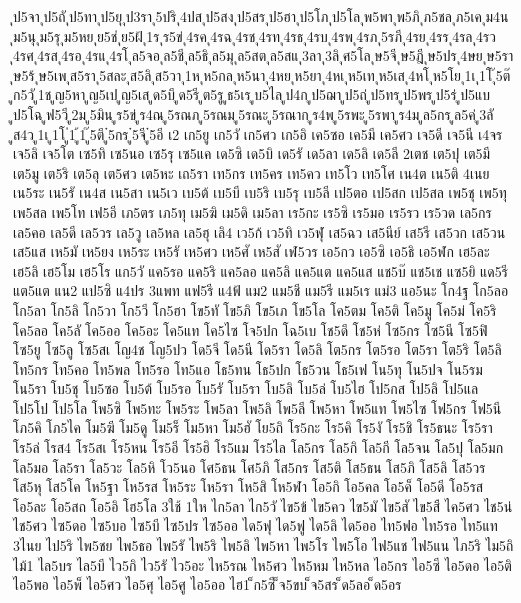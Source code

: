 {ุป5จา
ุป5ถั
ุป5ทา
ุป5ยุ
ุป3รา
ุ5ปริ
ุ4ปส
ุป5สง
ุป5สร
ุป5ฮา
ุป5โภ
ุป5โล
ุพ5พา
ุพ5ภิ
ุภ5ชล
ุภ5เค
ุม4น
ุม5นุ
ุม5รุ
ุม5หย
ุย5ช่
ุย5ฝ้
ุ1ร
ุร5ข่
ุ4รค
ุ4รฉ
ุ4รช
ุ4รท
ุ4รธ
ุ4รบ
ุ4รพ
ุ4รภ
ุ5รภี
ุ4รย
ุ4รร
ุ4รล
ุ4รว
ุ4รศ
ุ4รส
ุ4รอ
ุ4รแ
ุ4รโ
ุล5จอ
ุล5ชี
ุล5ธิ
ุล5มุ
ุล5สต
ุล5สแ
ุ3ลา
ุ3ลิ
ุศ5โล
ุษ5จี
ุษ5ฎี
ุษ5ปร
ุ4ษย
ุษ5รา
ุษ5ร้
ุษ5เพ
ุส5รา
ุ5สละ
ุส5ลิ
ุส5วา
ุ1ห
ุห5กล
ุห5นา
ุ4หย
ุห5ยา
ุ4หเ
ุห5เท
ุห5เส
ุ4หโ
ุห5โย
ุ1เ
ุ1โ
ุ๊5ต๊
ูก5วั
ู1ช
ูญ5หา
ูญ5เป
ูญ5เส
ูด5บึ
ูด5รี
ูต5รู
ูธ5เร
ูบ5ไล
ูป4ก
ูป5ฌา
ูป5ถ่
ูป5ทร
ูป5พร
ูป5ร่
ูป5แบ
ูป5โฉ
ูฟ5วี
ู2ม
ู5มิน
ูร5ข่
ูร4ณ
ู5รณภ
ู5รณม
ู5รณะ
ู5รณาก
ูร4พ
ู5รพะ
ู5รพา
ูร4ม
ูล5กร
ูล5ค่
ู3ลั
ูส4ว
ู1เ
ู1โ
ู่1
ู้1
ู๊5ตึ
ู๋5กร
ู๋5จี
ู๋5อี
เ2
เก5ยู
เก5วั
เก5ศว
เก5อิ
เค5ซอ
เค5มี
เค5ศว
เจ5ดี
เจ5นี
เ4จร
เจ5ลิ
เจ5โต
เซ5ทิ
เซ5นอ
เซ5รุ
เซ5แค
เด5ซิ
เด5บิ
เด5รั
เด5ลา
เด5ลิ
เด5ลี
2เตช
เต5ปุ
เต5มี
เต5มู
เต5ริ
เต5ลุ
เต5ศว
เต5หะ
เถ5รา
เท5กร
เท5คร
เท5คว
เท5โว
เท5โศ
เน4ต
เน5ติ
4เนย
เน5ระ
เน5รั
เน4ส
เน5สา
เน5เว
เบ5ต้
เบ5บี
เบ5ริ
เบ5รุ
เบ5ลี
เป5ตอ
เป5สก
เป5สล
เพ5ชุ
เพ5ทุ
เพ5สล
เพ5โท
เฟ5อี
เภ5ตร
เภ5ทุ
เม5ฆิ
เม5ดิ
เม5ลา
เร5กะ
เร5ซิ
เร5มอ
เร5รว
เร5วด
เล5กร
เล5คอ
เล5ดี
เล5วร
เล5วู
เล5หล
เล5ฮุ
เลิ4
เว5ก้
เว5ทิ
เว5ฬุ
เส5ฉว
เส5นีย์
เส5รี
เส5วก
เส5วน
เส5แส
เห5มั
เห5ยง
เห5ระ
เห5รั
เห5ศว
เห5ศั
เห5สั
เฬ5วร
เอ5กว
เอ5ซิ
เอ5ธิ
เอ5ฬก
เฮ5ละ
เฮ5ลิ
เฮ5โม
เฮ5โร
แก5วั
แค5รอ
แค5ริ
แค5ลอ
แค5ลิ
แค5แต
แค5แส
แช5บ๊
แช5เช
แซ5ยิ
แด5รี
แต5แต
แน2
แป5ซิ
แ4ปร
3แพท
แฟ5รี
แ4ฟ้
แม2
แม5ชี
แม5รี
แม5เร
แม่3
แอ5นะ
โก4ฐ
โก5ลอ
โก5ลา
โก5ลิ
โก5วา
โก5วี
โก5ฮา
โข5ทั
โข5ภิ
โข5เภ
โข5โล
โค5ตม
โค5ติ
โค5มู
โค5ม่
โค5ริ
โค5ลอ
โค5ลั
โค5ออ
โค5อะ
โค5แท
โค5ไซ
โจ5ปก
โฉ5เบ
โช5ดึ
โช5ห่
โซ5กร
โซ5นี
โซ5ฟิ
โซ5ยู
โซ5ลู
โซ5สเ
โญ4ช
โญ5ปว
โด5จี
โด5นี
โด5รา
โด5ลิ
โต5กร
โต5รอ
โต5รา
โต5ริ
โต5ลิ
โท5กร
โท5คอ
โท5พล
โท5รอ
โท5แอ
โธ5ทน
โธ5ปก
โธ5วน
โธ5เฟ
โน5ทุ
โน5ปจ
โน5รม
โน5รา
โบ5ชุ
โบ5ซอ
โบ5ต้
โบ5รอ
โบ5รั
โบ5รา
โบ5ลิ
โบ5ล่
โบ5ไฮ
โป5กส
โป5ลิ
โป5แล
โป5โป
โป5โล
โพ5ซิ
โพ5ทะ
โพ5ระ
โพ5ลา
โพ5ลิ
โพ5ลี
โพ5หา
โพ5แท
โพ5ไซ
โฟ5กร
โฟ5นี
โภ5คิ
โภ5ไค
โม5ฆี
โม5ดู
โม5ร็
โม5หา
โม5ฮั
โย5ถิ
โร5กะ
โร5คิ
โร5งั
โร5ชิ
โร5ธนะ
โร5รา
โร5ล่
โรส4
โร5สเ
โร5หน
โร5อี
โร5ฮิ
โร5แม
โร5ไล
โล5กร
โล5กิ
โล5กี
โล5จน
โล5ปุ
โล5มก
โล5มอ
โล5รา
โล5วะ
โล5หิ
โว5นอ
โศ5ธน
โศ5ภิ
โส5กร
โส5ติ
โส5ธน
โส5ภิ
โส5ลิ
โส5วร
โส5หุ
โส5โค
โห5ฐา
โห5รส
โห5ระ
โห5รา
โห5สิ
โห5ฬา
โอ5กิ
โอ5คล
โอ5ค็
โอ5ดี
โอ5รส
โอ5ละ
โอ5สถ
โอ5อิ
โฮ5โล
3ใช้
1ให
ไก5ลา
ไก5วั
ไข5ข้
ไข5คว
ไข5มั
ไข5สั
ไข5สื
ไค5ศว
ไช5น่
ไช5ศว
ไซ5ดอ
ไซ5บอ
ไซ5บี
ไซ5ปร
ไซ5ออ
ได5ฟุ
ได5ฟู
ได5ลิ
ได5ออ
ไท5ฟอ
ไท5รอ
ไท5แท
3ไนย
ไป5ริ
ไพ5ชย
ไพ5ธอ
ไพ5รั
ไพ5ริ
ไพ5ลิ
ไพ5หา
ไพ5โร
ไพ5โอ
ไฟ5แช
ไฟ5แน
ไภ5ริ
ไม5ถิ
ไม้1
ไล5บร
ไล5บี
ไว5กิ
ไว5รั
ไว5อะ
ไห5รณ
ไห5ศว
ไห5หม
ไห5หล
ไอ5กร
ไอ5ซี
ไอ5ดอ
ไอ5ติ
ไอ5พอ
ไอ5พ็
ไอ5ศว
ไอ5ศุ
ไอ5ศู
ไอ5ออ
ไฮ1
็ก5ซี
็จ5ขบ
็จ5สร
็ด5ลอ
็ด5อร
}
